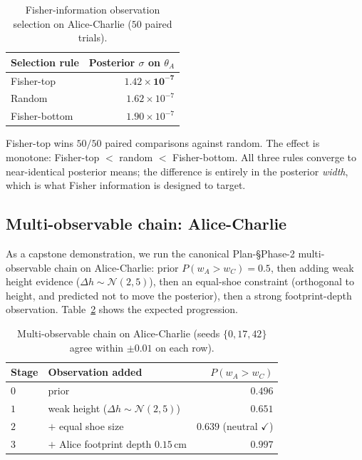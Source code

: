 \documentclass{article}
\begin{document}
\begin{table}[h]
\centering
\caption{Fisher-information observation selection on Alice-Charlie
($50$ paired trials).}
\label{tab:fisher}
\begin{tabular}{lr}
\toprule
Selection rule  & Posterior $\sigma$ on $\theta_{A}$ \\
\midrule
Fisher-top       & $\mathbf{1.42 \times 10^{-7}}$ \\
Random           & $1.62 \times 10^{-7}$ \\
Fisher-bottom    & $1.90 \times 10^{-7}$ \\
\bottomrule
\end{tabular}
\end{table}

Fisher-top wins $50 / 50$ paired comparisons against random. The
effect is monotone: Fisher-top $<$ random $<$ Fisher-bottom. All
three rules converge to near-identical posterior means; the
difference is entirely in the posterior \emph{width}, which is
what Fisher information is designed to target.

\subsection{Multi-observable chain: Alice-Charlie}
\label{sec:exp-chain}

As a capstone demonstration, we run the canonical Plan-§Phase-2
multi-observable chain on Alice-Charlie: prior $P(w_{A} > w_{C}) =
0.5$, then adding weak height evidence ($\Delta h \sim \mathcal{N}(2, 5)$),
then an equal-shoe constraint (orthogonal to height, and predicted
not to move the posterior), then a strong footprint-depth
observation. Table~\ref{tab:chain} shows the expected progression.

\begin{table}[h]
\centering
\caption{Multi-observable chain on Alice-Charlie (seeds $\{0, 17, 42\}$
agree within $\pm 0.01$ on each row).}
\label{tab:chain}
\begin{tabular}{llr}
\toprule
Stage & Observation added & $P(w_{A} > w_{C})$ \\
\midrule
$0$ & prior                                & $0.496$ \\
$1$ & weak height ($\Delta h \sim \mathcal{N}(2, 5)$) & $0.651$ \\
$2$ & $+$ equal shoe size                  & $0.639$ (neutral $\checkmark$) \\
$3$ & $+$ Alice footprint depth $0.15$\,cm & $\mathbf{0.997}$ \\
\bottomrule
\end{tabular}
\end{table}
\end{document}
